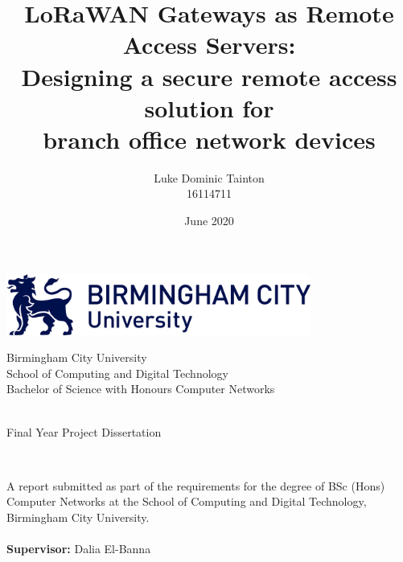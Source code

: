 \documentclass[a4paper]{scrreprt}
\begin{document}
\title{{LoRaWAN} Gateways as Remote Access Servers: \\ Designing a secure remote access solution for \\ branch office network devices}
\author{Luke Dominic Tainton \\ 16114711}

{\selectfont

\begin{titlingpage}
\begin{center}
\includegraphics[width=10cm]{img/cover/bcu.png} \\
\vspace{0.5cm}
\begin{large}
Birmingham City University \\
School of Computing and Digital Technology \\
Bachelor of Science with Honours Computer Networks \\
\end{large}
\vspace{4cm}
\begin{large}
\textbf{\thetitle} \\
Final Year Project Dissertation \\
\end{large}
\vspace{1cm}
\theauthor\\[0.2cm]
\date{June 2020}
\vspace{1cm}
A report submitted as part of the requirements for the degree of BSc (Hons) \\ Computer Networks at the School of Computing and Digital Technology, \\ Birmingham City University. \\
\vspace{1cm}
\thedate \\
\vspace{1cm}
\textbf{Supervisor:} Dalia El-Banna \\
\vspace{1cm}
\vspace{1cm}
\end{center}
\end{titlingpage}

}
\end{document}
